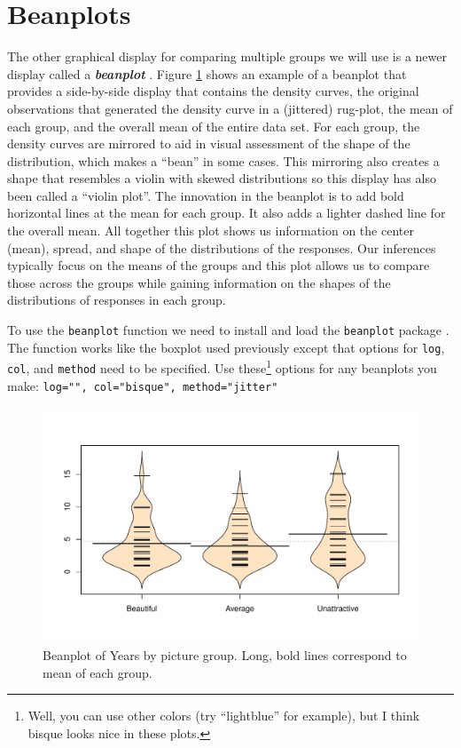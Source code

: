 \documentclass[]{book}
\let\rmarkdownfootnote\footnote%
\def\footnote{\protect\rmarkdownfootnote}
\theoremstyle{definition}
\theoremstyle{definition}
\theoremstyle{remark}
\begin{document}
\section{Beanplots}\label{section2-2}

The other graphical display for comparing multiple groups we will use is
a newer display called a \textbf{\emph{beanplot}} \citep{Kampstra2008}.
Figure \ref{fig:Figure2-5} shows an example of a beanplot that provides
a side-by-side display that contains the density curves, the original
observations that generated the density curve in a (jittered) rug-plot,
the mean of each group, and the overall mean of the entire data set. For
each group, the density curves are mirrored to aid in visual assessment
of the shape of the distribution, which makes a ``bean'' in some cases.
This mirroring also creates a shape that resembles a violin with skewed
distributions so this display has also been called a ``violin plot''.
The innovation in the beanplot is to add bold horizontal lines at the
mean for each group. It also adds a lighter dashed line for the overall
mean. All together this plot shows us information on the center (mean),
spread, and shape of the distributions of the responses. Our inferences
typically focus on the means of the groups and this plot allows us to
compare those across the groups while gaining information on the shapes
of the distributions of responses in each group.

To use the \texttt{beanplot} function we need to install and load the
\texttt{beanplot} package \citep{R-beanplot}. The function works like
the boxplot used previously except that options for \texttt{log},
\texttt{col}, and \texttt{method} need to be specified. Use
these\footnote{Well, you can use other colors (try ``lightblue'' for
  example), but I think bisque looks nice in these plots.} options for
any beanplots you make: \texttt{log="",\ col="bisque",\ method="jitter"}




\begin{figure}
\centering
\includegraphics{02-reintroductionToStatistics_files/figure-latex/Figure2-5-1.pdf}
\caption{\label{fig:Figure2-5}Beanplot of Years by picture group. Long, bold lines
correspond to mean of each group.}
\end{figure}
\end{document}
